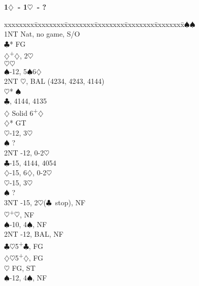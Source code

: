 \documentclass[10pt]{article}
\renewcommand{\c}{$\clubsuit$}
\renewcommand{\d}{$\diamondsuit$}
\newcommand{\h}{$\heartsuit$}
\newcommand{\s}{$\spadesuit$}
\newcommand{\p}{\textsuperscript{+}}
\newcommand{\m}{\textsuperscript{\textminus}}
\newenvironment{bidtable}[1][]
{\textbf{#1}
  \begin{adjustwidth}{1em}{}
    \addvspace{2pt}
    \begin{tabbing}
      xxxxxxxx\=xxxxxxxx\=xxxxxxxx\=xxxxxxxx\=xxxxxxxx\=xxxxxxxx\=\kill}
{\end{tabbing}\end{adjustwidth}\bigskip}%
\begin{document}
\begin{multicols*}{2}
\begin{bidtable}[1\d\ - 1\h\ - ?]
1\s  {}\s                                             \\
     \> 1NT  \> Nat, no game, S/O                       \\
     \c* \> FG                                      \\
     \>      \d {}\p\d, 2\m\h                     \\
     \>      \h {}\h                              \\
     \>      \s {}-12, 5\s 6\d                   \\
     \>      \> 2NT \h, BAL (4234, 4243, 4144)      \\
     \>      \>     \h* {}\s                      \\
     \>      \c {}, 4144, 4135                 \\
     \>      \d \> Solid 6\p\d                      \\
     \d* \> GT                                      \\
     \>      \h {}-12, 3\h                       \\
     \>      \s \> ?                                \\
     \>      \> 2NT -12, 0-2\h                     \\
     \>      \c {}-15, 4144, 4054                \\
     \>      \d {}-15, 6\d, 0-2\h                \\
     \>      \h {}-15, 3\h                       \\
     \>      \s \> ?                                \\
     \>      \> 3NT -15, 2\h (\c\ stop), NF        \\
     \h  {}\p\h, NF                               \\
     \s  {}-10, 4\s, NF                           \\
     \> 2NT  -12, BAL, NF                          \\
     \c  {}\h 5\p\c, FG                           \\
     \d  {}\h 5\p\d, FG                           \\
     \h  \> FG, ST                                  \\
     \s  {}-12, 4\s, NF                          \\

\end{bidtable}
\end{multicols*}
\end{document}
